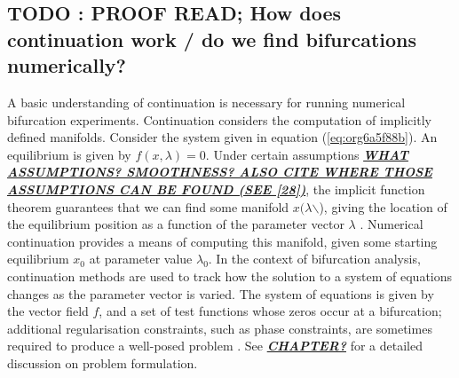 \documentclass[a4paper,twoside]{article}
\begin{document}
\subsection{{\bfseries\sffamily TODO} : PROOF READ; How does continuation work / do we find bifurcations numerically?}
\label{sec:org2d59b9c}
A basic understanding of continuation is necessary for running numerical bifurcation experiments.
Continuation considers the computation of implicitly defined manifolds.   
Consider the system given in equation (\ref{eq:org6a5f88b}).
An equilibrium is given by \(f(x,\lambda)=0\).
Under certain assumptions \uline{\emph{\textbf{WHAT ASSUMPTIONS? SMOOTHNESS? ALSO CITE WHERE THOSE ASSUMPTIONS CAN BE FOUND (SEE [28])}}}, the implicit function theorem guarantees that we can find some manifold \(x(\lambda\)$\backslash$), giving the location of the equilibrium position as a function of the parameter vector \(\lambda\) \cite{allgower2003introduction}.
Numerical continuation provides a means of computing this manifold, given some starting equilibrium \(x_0\) at parameter value \(\lambda_0\).
In the context of bifurcation analysis, continuation methods are used to track how the solution to a system of equations changes as the parameter vector is varied.
The system of equations is given by the vector field \(f\), and a set of test functions whose zeros occur at a bifurcation; additional regularisation constraints, such as phase constraints, are sometimes required to produce a well-posed problem \cite{doedel1991numerical}.
See \cite{dankowicz2013recipes} \uline{\emph{\textbf{CHAPTER?}}} for a detailed discussion on problem formulation.
\end{document}
